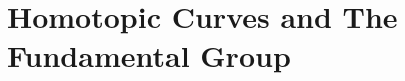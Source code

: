 \documentclass[../Moduli_Spaces_of_Riemann_Surfaces.tex]{subfiles}
\begin{document}
    \section{Homotopic Curves and The Fundamental Group}
\end{document}
